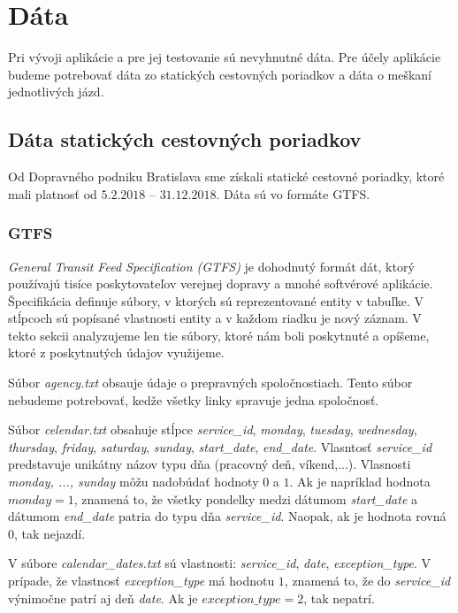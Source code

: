 \section{Dáta}
Pri vývoji aplikácie a pre jej testovanie sú nevyhnutné dáta. Pre účely aplikácie budeme potrebovať dáta zo statických cestovných poriadkov a dáta o meškaní jednotlivých jázd. 

\subsection{Dáta statických cestovných poriadkov}
Od Dopravného podniku Bratislava sme získali statické cestovné poriadky, ktoré mali platnosť od $5.2.2018$ – $31.12.2018$. Dáta sú vo formáte GTFS. 

\subsubsection{GTFS}
\textit{General Transit Feed Specification (GTFS)} je dohodnutý formát dát, ktorý používajú tisíce poskytovateľov verejnej dopravy a mnohé softvérové aplikácie. Špecifikácia definuje súbory, v ktorých sú reprezentované entity v tabuľke. V stĺpcoch sú popísané vlastnosti entity a v každom riadku je nový záznam. V tekto sekcii analyzujeme len tie súbory, ktoré nám boli poskytnuté a opíšeme, ktoré z poskytnutých údajov využijeme.

Súbor \textit{agency.txt} obsauje údaje o prepravných spoločnostiach. Tento súbor nebudeme potrebovať, kedže všetky linky spravuje jedna spoločnosť. 

Súbor \textit{celendar.txt} obsahuje stĺpce \textit{service\_id}, \textit{monday}, \textit{tuesday}, \textit{wednesday}, \textit{thursday}, \textit{friday}, \textit{saturday}, \textit{sunday}, \textit{start\_date}, \textit{end\_date}. Vlasntosť \textit{service\_id} predstavuje unikátny názov typu dňa (pracovný deň, víkend,...). Vlasnosti \textit{monday, ..., sunday} môžu nadobúdať hodnoty $0$ a $1$. Ak je napríklad hodnota $monday = 1$, znamená to, že všetky pondelky medzi dátumom \textit{start\_date} a dátumom \textit{end\_date} patria do typu dňa \textit{service\_id}. Naopak, ak je hodnota rovná $0$, tak nejazdí. 

V súbore \textit{calendar\_dates.txt} sú vlastnosti: \textit{service\_id}, \textit{date}, \textit{exception\_type}. V prípade, že vlastnosť \textit{exception\_type} má hodnotu $1$, znamená to, že do \textit{service\_id} výnimočne patrí aj deň \textit{date}. Ak je $exception\_type = 2$, tak nepatrí.

